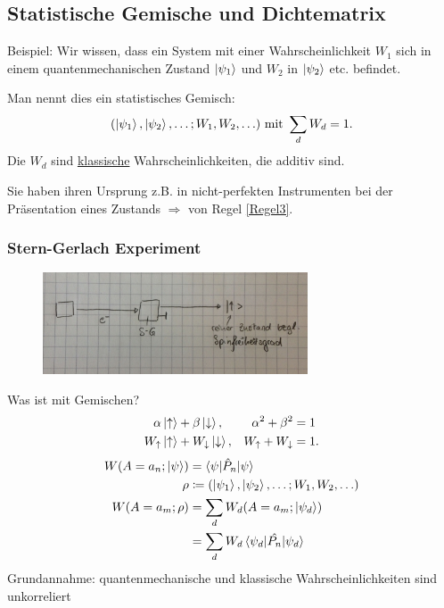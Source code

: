 \subsection{Statistische Gemische und Dichtematrix}
	Beispiel: Wir wissen, dass ein System mit einer Wahrscheinlichkeit $W_1$ sich in einem quantenmechanischen Zustand $\ket{\psi_1}$ und $W_2$ in $\ket{\psi_2}$ etc. befindet.
	
	Man nennt dies ein statistisches Gemisch:
		\begin{align*}
			(\ket{\psi_1}, \ket{\psi_2}, \ldots; W_1, W_2, \ldots) \text{ mit } \sum_d W_{d} = 1.
		\end{align*}
	Die $W_d$ sind \underline{klassische} Wahrscheinlichkeiten, die additiv sind. 
	
	Sie haben ihren Ursprung z.B. in nicht-perfekten Instrumenten bei der Präsentation eines Zustands
	$\Rightarrow$ von Regel \ref{Regel3}.
	\subsubsection*{Stern-Gerlach Experiment}
		\begin{figure} [h1]
			\begin{center}
				\includegraphics[width=0.7\textwidth]{Statistische_Gemische_und_Dichtematrix1}
			\end{center}
		\end{figure}
	Was ist mit Gemischen?
	\begin{align*}
		\alpha \ket{\uparrow} &+ \beta \ket{\downarrow},& \alpha^2 + \beta^2 &= 1 \\
		W_\uparrow\ket{\uparrow} &+ W_\downarrow \ket{\downarrow},& W_\uparrow + W_\downarrow &= 1.
	\end{align*}
	\begin{align*}
		W(A = a_n; \ket{\psi}) &= \braket{\psi | \hat{P}_n | \psi} \\
		\rho &\coloneqq (\ket{\psi_1}, \ket{\psi_2}, \ldots; W_1, W_2, \ldots) \\
		W(A=a_m; \rho) &= \sum_{d} W_d (A = a_m ; \ket{\psi_d}) \\
		&= \sum_d W_d \braket{\psi_d | \hat{P_n} | \psi_d} 
	\end{align*}
	Grundannahme: quantenmechanische und klassische Wahrscheinlichkeiten sind unkorreliert
	
